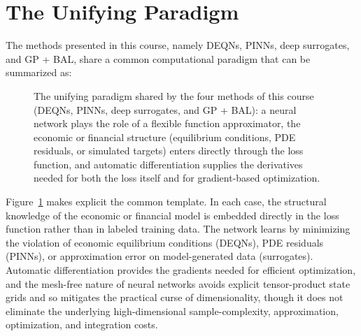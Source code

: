 \documentclass[11pt,a4paper]{report}
\begin{document}
\section{The Unifying Paradigm}

The methods presented in this course, namely DEQNs, PINNs, deep surrogates, and GP + BAL, share a common computational paradigm that can be summarized as:

\begin{figure}[ht]
\centering
{}
\caption{The unifying paradigm shared by the four methods of this course (DEQNs, PINNs, deep surrogates, and GP + BAL): a neural network plays the role of a flexible function approximator, the economic or financial structure (equilibrium conditions, PDE residuals, or simulated targets) enters directly through the loss function, and automatic differentiation supplies the derivatives needed for both the loss itself and for gradient-based optimization.}
\label{fig:unifying_paradigm}
\end{figure}

Figure~\ref{fig:unifying_paradigm} makes explicit the common template.  In each case, the structural knowledge of the economic or financial model is embedded directly in the loss function rather than in labeled training data.  The network learns by minimizing the violation of economic equilibrium conditions (DEQNs), PDE residuals (PINNs), or approximation error on model-generated data (surrogates).  Automatic differentiation provides the gradients needed for efficient optimization, and the mesh-free nature of neural networks avoids explicit tensor-product state grids and so mitigates the practical curse of dimensionality, though it does not eliminate the underlying high-dimensional sample-complexity, approximation, optimization, and integration costs.
\end{document}
